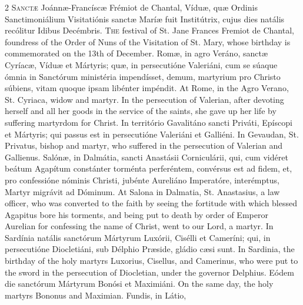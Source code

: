 \begin{paracol}{2}
\lettrine[lines=2]{S}{anctæ} Joánnæ-Francíscæ 
 Frémiot de Chantal, Víduæ, quæ Ordinis Sanctimoniálium Visitatiónis sanctæ 
 Maríæ fuit Institútrix, cujus dies natális recólitur Idibus Decémbris.
\switchcolumn
{}
\lettrine[lines=2]{T}{he} festival of St. Jane Frances 
 Fremiot de Chantal, foundress of the Order of Nuns of the Visitation of St. 
 Mary, whose birthday is commemorated on the 13th of December.
\switchcolumn*
{}
Romæ, in agro Veráno, 
 sanctæ Cyríacæ, Víduæ et Mártyris; quæ, in persecutióne Valeriáni, cum se 
 súaque ómnia in Sanctórum ministéria impendísset, demum, martyrium pro 
 Christo súbiens, vitam quoque ipsam libénter impéndit.
\switchcolumn
{}
At Rome, in the Agro Verano, St. 
 Cyriaca, widow and martyr. In the persecution of Valerian, after 
 devoting herself and all her goods in the service of the saints, she gave up 
 her life by suffering martyrdom for Christ.
\switchcolumn*
{}
In território 
 Gavalitáno sancti Priváti, Epíscopi et Mártyris; qui passus est in 
 persecutióne Valeriáni et Galliéni.
\switchcolumn
{}
In Gevaudan, St. Privatus, bishop 
 and martyr, who suffered in the persecution of Valerian and Gallienus.
\switchcolumn*
{}
Salónæ, in Dalmátia, sancti Anastásii Corniculárii, qui, cum vidéret beátum Agapítum constánter 
 torménta perferéntem, convérsus est ad fidem, et, pro confessióne nóminis 
 Christi, jubénte Aureliáno Imperatóre, interémptus, Martyr migrávit ad 
 Dóminum.
\switchcolumn
{}
At Salona in Dalmatia, St. 
 Anastasius, a law officer, who was converted to the faith by seeing the 
 fortitude with which blessed Agapitus bore his torments, and being put to 
 death by order of Emperor Aurelian for confessing the name of Christ, went 
 to our Lord, a martyr.
\switchcolumn*
{}
In Sardínia natális 
 sanctórum Mártyrum Luxórii, Cisélli et Cameríni; qui, in persecutióne 
 Diocletiáni, sub Délphio Præside, gládio cæsi sunt.
\switchcolumn
{}
In Sardinia, the birthday of the 
 holy martyrs Luxorius, Cisellus, and Camerinus, who were put to the sword in 
 the persecution of Diocletian, under the governor Delphius.
\switchcolumn*
{}
Eódem die sanctórum 
 Mártyrum Bonósi et Maximiáni.
\switchcolumn
{}
On the same day, the holy martyrs 
 Bononus and Maximian.
\switchcolumn*
{}
Fundis, in Látio, 

\end{paracol}
